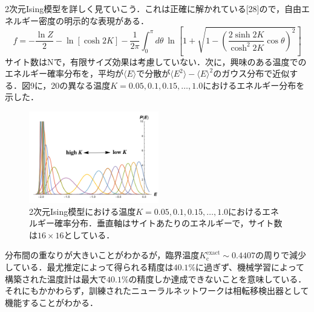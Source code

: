 \documentclass[a4paper,11pt]{jsarticle}
\begin{document}
2次元Ising模型を詳しく見ていこう．これは正確に解かれている[28]ので，自由エネルギー密度の明示的な表現がある．
\begin{equation}
  f = -\frac{\ln{Z}}{2} - \ln{[\cosh{2K}]} - \frac{1}{2\pi}\int_{0}^{\pi}d\theta \ \ln{\left[1 + \sqrt{1- \left(\frac{2\sinh{2K}}{\cosh^2{2K}}\cos{\theta}\right)^2}\right]}
\end{equation}
サイト数はNで，有限サイズ効果は考慮していない．次に，興味のある温度でのエネルギー確率分布を，平均が$\langle E \rangle$で分散が$\langle E^2 \rangle - \langle E \rangle^2$のガウス分布で近似する．図9に，20の異なる温度$K = 0.05, 0.1, 0.15, \dots, 1.0$におけるエネルギー分布を示した．
\begin{figure}
  \begin{center}
    \includegraphics[height=4cm]{image/Figure9.png}
    \caption{2次元Ising模型における温度$K = 0.05, 0.1, 0.15, \dots, 1.0$におけるエネルギー確率分布．垂直軸はサイトあたりのエネルギーで，サイト数は$16\times 16$としている．}
  \end{center}
\end{figure}
分布間の重なりが大きいことがわかるが，臨界温度$K_{\text{c}}^{\text{exact}} \sim 0.4407 $の周りで減少している．最尤推定によって得られる精度は$40.1\%$に過ぎず、機械学習によって構築された温度計は最大で$40.1\%$の精度しか達成できないことを意味している．それにもかかわらず，訓練されたニューラルネットワークは相転移検出器として機能することがわかる．
\end{document}

